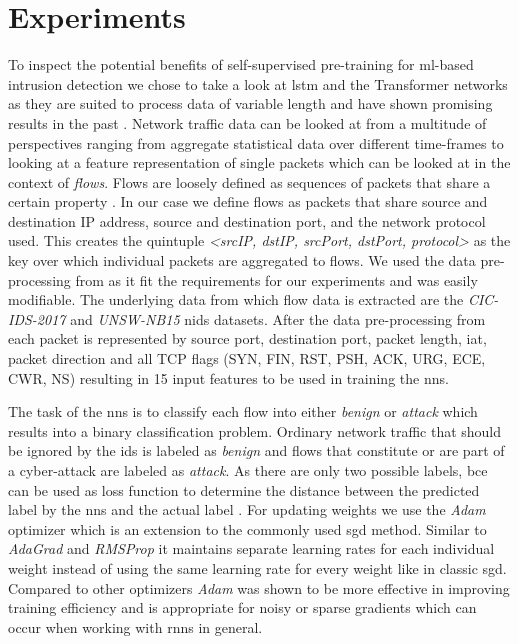 \chapter{Experiments}\label{sec:experiments}

To inspect the potential benefits of self-supervised pre-training for \gls{ml}-based intrusion detection we chose to take a look at \gls{lstm} and the Transformer networks as they are suited to process data of variable length and have shown promising results in the past . Network traffic data can be looked at from a multitude of perspectives ranging from aggregate statistical data over different time-frames \cite{kitsune} to looking at a feature representation of single packets which can be looked at in the context of \textit{flows}. Flows are loosely defined as sequences of packets that share a certain property \cite{adversarial_recurrent_ids}. In our case we define flows as packets that share source and destination IP address, source and destination port, and the network protocol used. This creates the quintuple \textit{<srcIP, dstIP, srcPort, dstPort, protocol>} as the key over which individual packets are aggregated to flows. We used the data pre-processing from \cite{adversarial_recurrent_ids} as it fit the requirements for our experiments and was easily modifiable. The underlying data from which flow data is extracted are the \textit{CIC-IDS-2017} \cite{cic_ids_2017} and \textit{UNSW-NB15} \cite{unsw_nb15} \gls{nids} datasets. After the data pre-processing from \cite{adversarial_recurrent_ids} each packet is represented by source port, destination port, packet length, \gls{iat}, packet direction and all TCP flags (SYN, FIN, RST, PSH, ACK, URG, ECE, CWR, NS) resulting in 15 input features to be used in training the \glspl{nn}. \par

The task of the \glspl{nn} is to classify each flow into either \textit{benign} or \textit{attack} which results into a binary classification problem. Ordinary network traffic that should be ignored by the \gls{ids} is labeled as \textit{benign} and flows that constitute or are part of a cyber-attack are labeled as \textit{attack}. As there are only two possible labels, \gls{bce} can be used as loss function to determine the distance between the predicted label by the \glspl{nn} and the actual label . For updating weights we use the \textit{Adam} optimizer \cite{adam} which is an extension to the commonly used \gls{sgd} method. Similar to \textit{AdaGrad} \cite{optimizer_comparison} and \textit{RMSProp} \cite{optimizer_comparison} it maintains separate learning rates for each individual weight instead of using the same learning rate for every weight like in classic \gls{sgd}. Compared to other optimizers \textit{Adam} was shown to be more effective in improving training efficiency \cite{adam} and is appropriate for noisy or sparse gradients which can occur when working with \glspl{rnn} in general.

